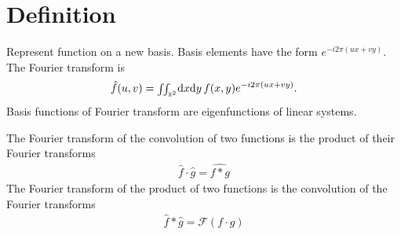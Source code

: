 \section{Definition}
Represent function on a new basis. Basis elements have the form $e^{-i2\pi(ux+vy)}$. The Fourier transform is
\begin{gather*}
	\hat{f}(u,v)={\scriptstyle\iint_{\mathbb{R}^2}}^{}\mathrm d x\mathrm d y\, f(x,y) e^{-i2\pi (ux+vy)}.
\end{gather*}
Basis functions of Fourier transform are eigenfunctions of linear systems.
\begin{compactdesc}
	\item[\lp{Important functions}]\hfill
\item[\lp{Convolution theorem}] 
	\begin{inparaenum}[\itshape(1)]
		\item The Fourier transform of the convolution of two functions is the product of their Fourier transforms
			\begin{gather*}
				\hat{f}\cdot\hat{g}=\widehat{f* g}
			\end{gather*}
			The Fourier transform of the product of two functions is the convolution of the Fourier transforms
			\begin{gather*}
				\hat{f}*\hat{g}=\mathcal{F}(f\cdot g)
			\end{gather*}
	\end{inparaenum}

\end{compactdesc}

